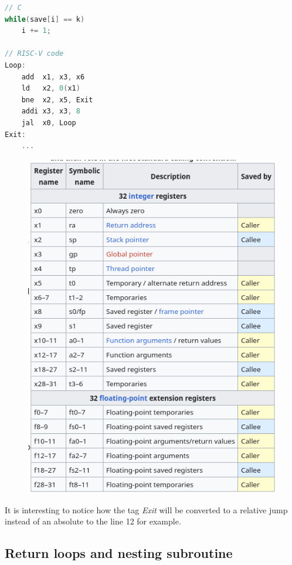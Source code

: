 \documentclass{report}
\begin{document}
\begin{lstlisting}[language=C]
// C
while(save[i] == k)
    i += 1;

// RISC-V code
Loop:
    add  x1, x3, x6
    ld   x2, 0(x1)
    bne  x2, x5, Exit
    addi x3, x3, 8
    jal  x0, Loop
Exit:
    ...
\end{lstlisting}

\begin{figure}
  \begin{center}
        \includegraphics[width=0.9\linewidth]{caller_callee.png}
        \label{fig:caller-callee}
  \end{center}
\end{figure}

It is interesting to notice how the tag \textit{Exit} will be converted to a relative jump instead of an absolute to the line 12 for example.

\subsection{Return loops and nesting subroutine}
\end{document}
